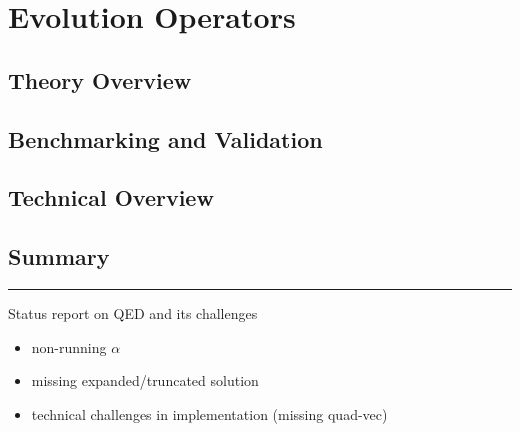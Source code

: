 
\chapter{Evolution Operators}
\label{ch:eko}
\minitoc
\adjustmtc



\section{Theory Overview}
\label{sec:eko/theory}


\section{Benchmarking and Validation}
\label{sec:eko/pheno}


\section{Technical Overview}
\label{sec:eko/code}


\section{Summary}
\label{sec:eko/concl}


\vspace*{20pt}
\noindent
\rule{\hsize}{1pt}

Status report on QED and its challenges

\begin{itemize}
	\item non-running $\alpha$
	\item missing expanded/truncated solution
	\item technical challenges in implementation (missing quad-vec)
\end{itemize}
